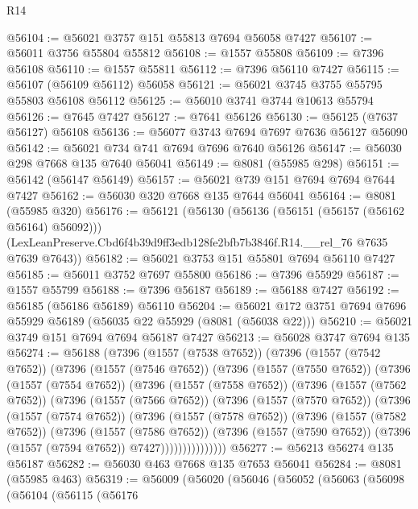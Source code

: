 \begin{lexlean}{R14}
\begin{coremodule}
@56104 := @56021 @3757 @151 @55813 @7694 @56058 @7427
@56107 := @56011 @3756 @55804 @55812
@56108 := @1557 @55808
@56109 := @7396 @56108
@56110 := @1557 @55811
@56112 := @7396 @56110 @7427
@56115 := @56107 (@56109 @56112) @56058
@56121 := @56021 @3745 @3755 @55795 @55803 @56108 @56112
@56125 := @56010 @3741 @3744 @10613 @55794
@56126 := @7645 @7427
@56127 := @7641 @56126
@56130 := @56125 (@7637 @56127) @56108
@56136 := @56077 @3743 @7694 @7697 @7636 @56127 @56090
@56142 := @56021 @734 @741 @7694 @7696 @7640 @56126
@56147 := @56030 @298 @7668 @135 @7640 @56041
@56149 := @8081 (@55985 @298)
@56151 := @56142 (@56147 @56149)
@56157 := @56021 @739 @151 @7694 @7694 @7644 @7427
@56162 := @56030 @320 @7668 @135 @7644 @56041
@56164 := @8081 (@55985 @320)
@56176 := @56121
    (@56130
      (@56136 (@56151 (@56157 (@56162 @56164) @56092)))
      (LexLeanPreserve.Cbd6f4b39d9ff3edb128fe2bfb7b3846f.R14.__rel_76 @7635 @7639 @7643))
@56182 := @56021 @3753 @151 @55801 @7694 @56110 @7427
@56185 := @56011 @3752 @7697 @55800
@56186 := @7396 @55929
@56187 := @1557 @55799
@56188 := @7396 @56187
@56189 := @56188 @7427
@56192 := @56185 (@56186 @56189) @56110
@56204 := @56021 @172 @3751 @7694 @7696 @55929 @56189 (@56035 @22 @55929 (@8081 (@56038 @22)))
@56210 := @56021 @3749 @151 @7694 @7694 @56187 @7427
@56213 := @56028 @3747 @7694 @135
@56274 := @56188
    (@7396
      (@1557 (@7538 @7652))
      (@7396
        (@1557 (@7542 @7652))
        (@7396
          (@1557 (@7546 @7652))
          (@7396
            (@1557 (@7550 @7652))
            (@7396
              (@1557 (@7554 @7652))
              (@7396
                (@1557 (@7558 @7652))
                (@7396
                  (@1557 (@7562 @7652))
                  (@7396
                    (@1557 (@7566 @7652))
                    (@7396
                      (@1557 (@7570 @7652))
                      (@7396
                        (@1557 (@7574 @7652))
                        (@7396
                          (@1557 (@7578 @7652))
                          (@7396
                            (@1557 (@7582 @7652))
                            (@7396
                              (@1557 (@7586 @7652))
                              (@7396
                                (@1557 (@7590 @7652))
                                (@7396 (@1557 (@7594 @7652)) @7427)))))))))))))))
@56277 := @56213 @56274 @135 @56187
@56282 := @56030 @463 @7668 @135 @7653 @56041
@56284 := @8081 (@55985 @463)
@56319 := @56009
    (@56020
      (@56046
        (@56052
          (@56063
            (@56098
              (@56104
                (@56115
                  (@56176

\end{coremodule}
\end{lexlean}
